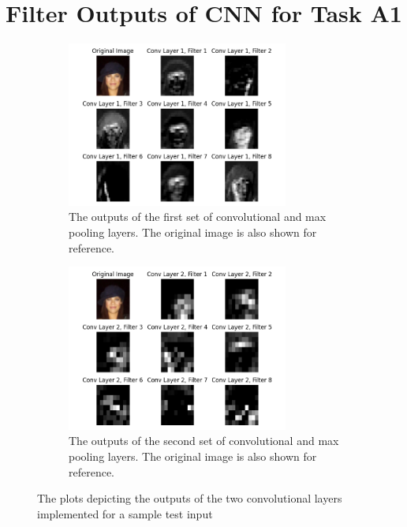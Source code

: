 \documentclass{article}
\begin{document}
\printbibliography

\clearpage
\onecolumn
\appendix
\appendixpage

\section{Filter Outputs of CNN for Task A1}
\label{sec:a1_cnn_filter_outputs}

	\begin{figure}[H]
		\centering
		\begin{subfigure}{0.75\textwidth}
			\centering
			\includegraphics[width=0.8\textwidth]{cnn_filter1.png}
			\caption{The outputs of the first set of convolutional and max pooling layers. The original image is also shown for reference.}
			\label{fig:cnn_filter1}	
		\end{subfigure}
		\begin{subfigure}{0.75\textwidth}
			\centering
			\includegraphics[width=0.8\textwidth]{cnn_filter2.png}
			\caption{The outputs of the second set of convolutional and max pooling layers. The original image is also shown for reference.}
			\label{fig:cnn_filter2}	
		\end{subfigure}
		\caption{The plots depicting the outputs of the two convolutional layers implemented for a sample test input}
		\label{fig:cnn_filter_output}
	\end{figure}
\end{document}
